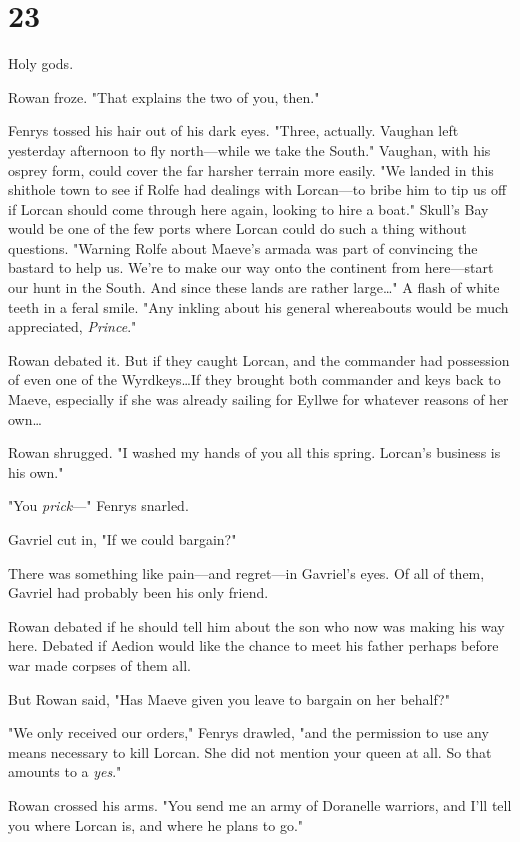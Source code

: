 
\chapter{23}

Holy gods.

Rowan froze.
"That explains the two of you, then."

Fenrys tossed his hair out of his dark eyes.
"Three, actually.
Vaughan left yesterday afternoon to fly north---while we take the South."
Vaughan, with his osprey form, could cover the far harsher terrain more easily.
"We landed in this shithole town to see if Rolfe had dealings with Lorcan---to bribe him to tip us off if Lorcan should come through here again, looking to hire a boat."
Skull's Bay would be one of the few ports where Lorcan could do such a thing without questions.
"Warning Rolfe about Maeve's armada was part of convincing the bastard to help us.
We're to make our way onto the continent from here---start our hunt in the South.
And since these lands are rather large\ldots" A flash of white teeth in a feral smile.
"Any inkling about his general whereabouts would be much appreciated, \emph{Prince}."

Rowan debated it.
But if they caught Lorcan, and the commander had possession of even one of the Wyrdkeys\ldots If they brought both commander and keys back to Maeve, especially if she was already sailing for Eyllwe for whatever reasons of her own\ldots{}

Rowan shrugged.
"I washed my hands of you all this spring.
Lorcan's business is his own."

"You \emph{prick}---" Fenrys snarled.

Gavriel cut in, "If we could bargain?"

There was something like pain---and regret---in Gavriel's eyes.
Of all of them, Gavriel had probably been his only friend.

Rowan debated if he should tell him about the son who now was making his way here.
Debated if Aedion would like the chance to meet his father  perhaps before war made corpses of them all.

But Rowan said, "Has Maeve given you leave to bargain on her behalf?"

"We only received our orders," Fenrys drawled, "and the permission to use any means necessary to kill Lorcan.
She did not mention your queen at all.
So that amounts to a \emph{yes}."

Rowan crossed his arms.
"You send me an army of Doranelle warriors, and I'll tell you where Lorcan is, and where he plans to go."

